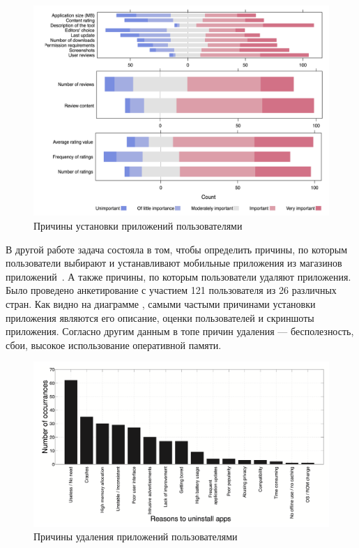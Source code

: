 \documentclass[a4paper,14pt]{extarticle} %
\begin{document}
	\begin{figure}[h]
		\includegraphics[width=\textwidth]{install_reasons}
		\caption{Причины установки приложений пользователями}
		\label{fig:install_reasons}
	\end{figure}
	
	В другой работе задача состояла в том, чтобы определить причины, по которым пользователи выбирают и устанавливают мобильные приложения из магазинов приложений~\parencite{ickin2017users}. А также причины, по которым пользователи удаляют приложения. Было проведено анкетирование с участием 121 пользователя из 26 различных стран. Как видно на диаграмме \ris{\ref{fig:install_reasons}}, самыми частыми причинами установки приложения являются его описание, оценки пользователей и скриншоты приложения. Согласно другим данным \ris{\ref{fig:delete_reasons}} в топе причин удаления --- бесполезность, сбои, высокое использование оперативной памяти.
	
	\begin{figure}[h]
		\includegraphics[width=\textwidth]{delete_reasons}
		\caption{Причины удаления приложений пользователями}
		\label{fig:delete_reasons}
	\end{figure}
	
\end{document}
